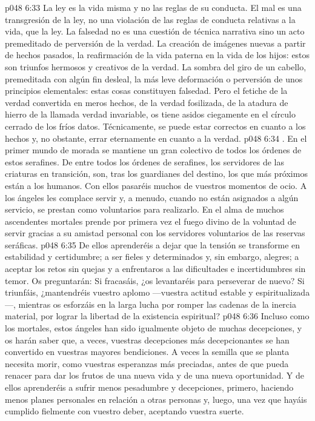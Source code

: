 \vs p048 6:33 La ley es la vida misma y no las reglas de su conducta. El mal es una transgresión de la ley, no una violación de las reglas de conducta relativas a la vida, que  la ley. La falsedad no es una cuestión de técnica narrativa sino un acto premeditado de perversión de la verdad. La creación de imágenes nuevas a partir de hechos pasados, la reafirmación de la vida paterna en la vida de los hijos: estos son triunfos hermosos y creativos de la verdad. La sombra del giro de un cabello, premeditada con algún fin desleal, la más leve deformación o perversión de unos principios elementales: estas cosas constituyen falsedad. Pero el fetiche de la verdad convertida en meros hechos, de la verdad fosilizada, de la atadura de hierro de la llamada verdad invariable, os tiene asidos ciegamente en el círculo cerrado de los fríos datos. Técnicamente, se puede estar correctos en cuanto a los hechos y, no obstante, errar eternamente en cuanto a la verdad.
\vs p048 6:34 . En el primer mundo de morada se mantiene un gran colectivo de todos los órdenes de estos serafines. De entre todos los órdenes de serafines, los servidores de las criaturas en transición, son, tras los guardianes del destino, los que más próximos están a los humanos. Con ellos pasaréis muchos de vuestros momentos de ocio. A los ángeles les complace servir y, a menudo, cuando no están asignados a algún servicio, se prestan como voluntarios para realizarlo. En el alma de muchos ascendentes mortales prende por primera vez el fuego divino de la voluntad de servir gracias a su amistad personal con los servidores voluntarios de las reservas seráficas.
\vs p048 6:35 De ellos aprenderéis a dejar que la tensión se transforme en estabilidad y certidumbre; a ser fieles y determinados y, sin embargo, alegres; a aceptar los retos sin quejas y a enfrentaros a las dificultades e incertidumbres sin temor. Os preguntarán: Si fracasáis, ¿os levantaréis para perseverar de nuevo? Si triunfáis, ¿mantendréis vuestro aplomo ---vuestra actitud estable y espiritualizada---, mientras os esforzáis en la larga lucha por romper las cadenas de la inercia material, por lograr la libertad de la existencia espiritual?
\vs p048 6:36 Incluso como los mortales, estos ángeles han sido igualmente objeto de muchas decepciones, y os harán saber que, a veces, vuestras decepciones más decepcionantes se han convertido en vuestras mayores bendiciones. A veces la semilla que se planta necesita morir, como vuestras esperanzas más preciadas, antes de que pueda renacer para dar los frutos de una nueva vida y de una nueva oportunidad. Y de ellos aprenderéis a sufrir menos pesadumbre y decepciones, primero, haciendo menos planes personales en relación a otras personas y, luego, una vez que hayáis cumplido fielmente con vuestro deber, aceptando vuestra suerte.
